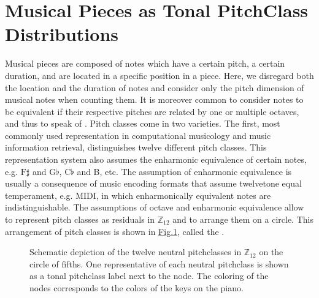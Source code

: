\documentclass[letterpaper,10pt,english]{sphinxmanual}
\begin{document}
\section{Musical Pieces as Tonal Pitch\sphinxhyphen{}Class Distributions}
\label{\detokenize{tonality:musical-pieces-as-tonal-pitch-class-distributions}}
Musical pieces are composed of notes which have a certain pitch, a certain duration, and are
located in a specific position in a piece. Here, we disregard both the location and the duration
of notes and consider only the pitch dimension of musical notes when counting them. It is
moreover common to consider notes to be equivalent if their respective pitches are related by
one or multiple octaves, and thus to speak of . Pitch classes come in two varieties.
The first, most commonly used representation in computational musicology and music
information retrieval, distinguishes twelve different pitch classes. This representation system
also assumes the enharmonic equivalence of certain notes, e.g. \(\text{F}\sharp\)
and \(\text{G}\flat\), \(\text{C}\flat\) and B, etc. The
assumption of enharmonic equivalence is usually a consequence of music encoding formats
that assume twelve\sphinxhyphen{}tone equal temperament, e.g. MIDI, in which enharmonically equivalent
notes are indistinguishable. The assumptions of octave and enharmonic equivalence allow to
represent pitch classes as residuals in \(\mathbb{Z}_{12}\) and to arrange them on a circle.
This arrangement of pitch classes is shown in \hyperref[\detokenize{tonality:circle-of-fifths}]{Fig.\@ \ref{\detokenize{tonality:circle-of-fifths}}}, called the .

\begin{figure}[htbp]
\centering
\capstart

\noindent{}
\caption{Schematic depiction of the twelve neutral pitch\sphinxhyphen{}classes in \(\mathbb{Z}_{12}\) on the circle of fifths. One
representative of each neutral pitch\sphinxhyphen{}class is shown as a tonal pitch\sphinxhyphen{}class label next to the
node. The coloring of the nodes corresponds to the colors of the keys on the piano.}\label{\detokenize{tonality:id16}}\label{\detokenize{tonality:circle-of-fifths}}\end{figure}
\end{document}
